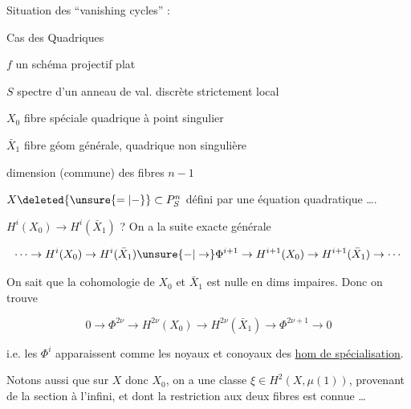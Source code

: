 
Situation des ``vanishing cycles'' :


Cas des Quadriques



$f$ un schéma projectif plat

$S$ spectre d'un anneau de val. discrète strictement local

$X_0$ fibre spéciale quadrique à point singulier

$\bar X_1$ fibre géom générale, quadrique non singulière

dimension (commune) des fibres $n-1$

\unsure{$\mathrm{I}$|$[$}


$X\deleted{\unsure{=|{-}}}\subset P^n_S$ défini par une équation quadratique \ldots.

$H^i(X_0)\to H^i(\bar X_1)$ ? On a la suite exacte générale

\[
\cdots\to H^i(X_0)\to H^i(\bar X_1)\unsure{\mathord{-}|\to}\Phi^{i+1}\to H^{i+1}(X_0)\to H^{i+1}(\bar X_1)\to\cdots
\]


On sait que la cohomologie de  $X_0$ et $\bar X_1$ est nulle en dims impaires. Donc on trouve

\[
0\to\Phi^{2\nu}\to H^{2\nu}(X_0)\to H^{2\nu}(\bar X_1)\to\Phi^{2\nu+1}\to0
\]

i.e. les $\Phi^{i}$ apparaissent  comme les noyaux et conoyaux des \uline{hom de spécialisation}.

Notons aussi que sur $X$ donc $X_0$, on a une classe $\xi\in H^2(X,\mu(1))$, provenant de la section à l'infini, et dont la restriction aux deux fibres est connue \ldots



